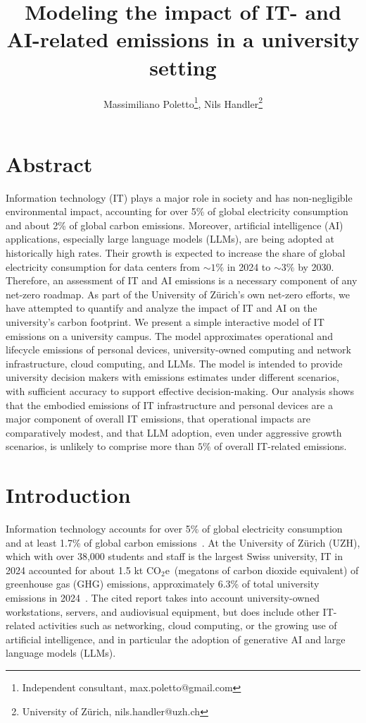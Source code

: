 \documentclass[11pt]{article}
\title{Modeling the impact of IT- and AI-related emissions in a university setting}
\author{Massimiliano Poletto\thanks{Independent consultant, max.poletto@gmail.com}, Nils Handler\thanks{University of Zürich, nils.handler@uzh.ch}}
\newcommand{\coe}{CO$_2$e}
\newcommand{\tcoe}{t \coe}
\begin{document}
\maketitle

\section*{Abstract}
Information technology (IT) plays a major role in society and has non-negligible environmental impact, accounting for over 5\% of global electricity consumption and about 2\% of global carbon emissions. Moreover, artificial intelligence (AI) applications, especially large language models (LLMs), are being adopted at historically high rates. Their growth is expected to increase the share of global electricity consumption for data centers from $\sim 1\%$ in 2024 to $\sim 3\%$ by 2030. Therefore, an assessment of IT and AI emissions is a necessary component of any net-zero roadmap. As part of the University of Zürich's own net-zero efforts, we have attempted to quantify and analyze the impact of IT and AI on the university's carbon footprint. We present a simple interactive model of IT emissions on a university campus. The model approximates operational and lifecycle emissions of personal devices, university-owned computing and network infrastructure, cloud computing, and LLMs. The model is intended to provide university decision makers with emissions estimates under different scenarios, with sufficient accuracy to support effective decision-making. Our analysis shows that the embodied emissions of IT infrastructure and personal devices are a major component of overall IT emissions, that operational impacts are comparatively modest, and that LLM adoption, even under aggressive growth scenarios, is unlikely to comprise more than $5\%$ of overall IT-related emissions.

\section{Introduction}

Information technology accounts for over 5\% of global electricity consumption and at least 1.7\% of global carbon emissions~\cite{wb:itu:ict}. At the University of Zürich (UZH), which with over 38,000 students and staff is the largest Swiss university, IT in 2024 accounted for about 1.5 k\tcoe\ (megatons of carbon dioxide equivalent) of greenhouse gas (GHG) emissions, approximately 6.3\% of total university emissions in 2024~\cite{uzh:sustainability:report}. The cited report takes into account university-owned workstations, servers, and audiovisual equipment, but does include other IT-related activities such as networking, cloud computing, or the growing use of artificial intelligence, and in particular the adoption of generative AI and large language models (LLMs).
\end{document}
